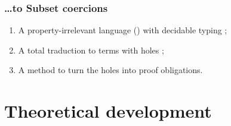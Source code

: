 \begin{frame}[t]
  \frametitle{\ldots to Subset coercions}
  
  \begin{enumerate}
  \item<1-> A property-irrelevant language (\lng{}) with \alert{decidable} typing ;
  \item<2-> A total traduction to \Coq{} terms with holes ;
  \item<3-> A method to turn the holes into proof obligations.
  \end{enumerate}
  


\end{frame}

\section{Theoretical development}
\frame{\tableofcontents[currentsection]}

\subsection{\lng{}}

